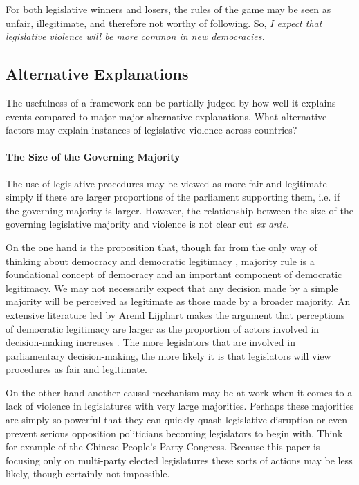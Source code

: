 \documentclass[a4paper]{article}\usepackage{graphicx, color}
\begin{document}
For both legislative winners and losers, the rules of the game may be seen as unfair, illegitimate, and therefore not worthy of following. So, \emph{I expect that legislative violence will be more common in new democracies.}

\subsection{Alternative Explanations}

The usefulness of a framework can be partially judged by how well it explains events compared to major major alternative explanations. What alternative factors may explain instances of legislative violence across countries?

\paragraph{The Size of the Governing Majority}

The use of legislative procedures may be viewed as more fair and legitimate simply if there are larger proportions of the parliament supporting them, i.e. if the governing majority is larger. However, the relationship between the size of the governing legislative majority and violence is not clear cut \emph{ex ante}. 

On the one hand is the proposition that, though far from the only way of thinking about democracy and democratic legitimacy \cite[see][for a discussion]{Follesdal2006}, majority rule is a foundational concept of democracy \cite{Dahl1989} and an important component of democratic legitimacy. We may not necessarily expect that any decision made by a simple majority will be perceived as legitimate as those made by a broader majority. An extensive literature led by Arend Lijphart makes the argument that perceptions of democratic legitimacy are larger as the proportion of actors involved in decision-making increases \citep{Lijphart2007}. The more legislators that are involved in parliamentary decision-making, the more likely it is that legislators will view procedures as fair and legitimate. 

On the other hand another causal mechanism may be at work when it comes to a lack of violence in legislatures with very large majorities. Perhaps these majorities are simply so powerful that they can quickly quash legislative disruption or even prevent serious opposition politicians becoming legislators to begin with. Think for example of the Chinese People's Party Congress. Because this paper is focusing only on multi-party elected legislatures these sorts of actions may be less likely, though certainly not impossible. 
\end{document}
